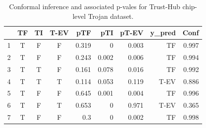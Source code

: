 \begin{table}[t]
\centering
\caption{Conformal inference and associated p-vales for Trust-Hub chip-level Trojan dataset.}
\begin{tabular}{lcccrrrrr}
\hline
  & \textbf{TF} & \textbf{TI} & \textbf{T-EV} & \textbf{pTF} & \textbf{pTI} & \textbf{pT-EV} & \textbf{y\_pred} & \textbf{Conf}\\ \hline
1 & T           & F           & F           & 0.319        & 0            & 0.003        & TF  & 0.997             \\ \hline
2 & T           & F           & F           & 0.243        & 0.002        & 0.006        & TF  & 0.994             \\ \hline
3 & T           & T           & F           & 0.161        & 0.078        & 0.016        & TF   & 0.992            \\ \hline
4 & T           & T           & T           & 0.114        & 0.053        & 0.119        & T-EV  & 0.886           \\ \hline
5 & T           & F           & F           & 0.645        & 0.001        & 0.004            & TF   & 0.996           \\ \hline
6 & T           & F           & T           & 0.653            & 0            & 0.971        & T-EV    & 0.365         \\ \hline
7 & T           & F           & F           & 0.3          & 0            & 0.002        & TF      & 0.998         \\ \hline
\end{tabular}
\label{tab:conformalresults}
\end{table}

